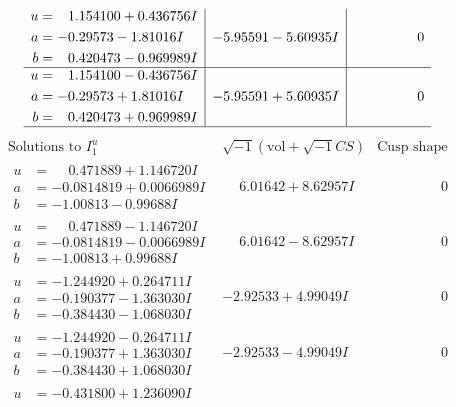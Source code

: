 \documentclass[1p]{elsarticle_modified}
\theoremstyle{definition}
\newcommand{\I}{\sqrt{-1}}
\begin{document}
$$\begin{array}{c|c|c}
\begin{aligned}
u &= \phantom{-}1.154100 + 0.436756 I \\
a &= -0.29573 - 1.81016 I \\
b &= \phantom{-}0.420473 - 0.969989 I\end{aligned}
 & -5.95591 - 5.60935 I & \phantom{-0.000000 } 0 \\ \hline\begin{aligned}
u &= \phantom{-}1.154100 - 0.436756 I \\
a &= -0.29573 + 1.81016 I \\
b &= \phantom{-}0.420473 + 0.969989 I\end{aligned}
 & -5.95591 + 5.60935 I & \phantom{-0.000000 } 0\\
 \hline 
 \end{array}$$\newpage$$\begin{array}{c|c|c}  
\text{Solutions to }I^u_{1}& \I (\text{vol} + \sqrt{-1}CS) & \text{Cusp shape}\\
 \hline 
\begin{aligned}
u &= \phantom{-}0.471889 + 1.146720 I \\
a &= -0.0814819 + 0.0066989 I \\
b &= -1.00813 - 0.99688 I\end{aligned}
 & \phantom{-}6.01642 + 8.62957 I & \phantom{-0.000000 } 0 \\ \hline\begin{aligned}
u &= \phantom{-}0.471889 - 1.146720 I \\
a &= -0.0814819 - 0.0066989 I \\
b &= -1.00813 + 0.99688 I\end{aligned}
 & \phantom{-}6.01642 - 8.62957 I & \phantom{-0.000000 } 0 \\ \hline\begin{aligned}
u &= -1.244920 + 0.264711 I \\
a &= -0.190377 - 1.363030 I \\
b &= -0.384430 - 1.068030 I\end{aligned}
 & -2.92533 + 4.99049 I & \phantom{-0.000000 } 0 \\ \hline\begin{aligned}
u &= -1.244920 - 0.264711 I \\
a &= -0.190377 + 1.363030 I \\
b &= -0.384430 + 1.068030 I\end{aligned}
 & -2.92533 - 4.99049 I & \phantom{-0.000000 } 0 \\ \hline\begin{aligned}
u &= -0.431800 + 1.236090 I \\

\end{aligned}
\end{array}$$
\end{document}
